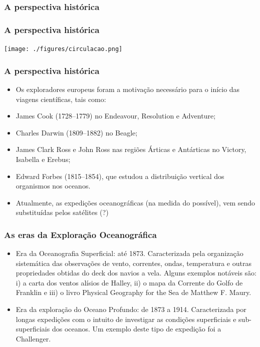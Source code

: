 \documentclass[14pt,xcolor=dvipsnames]{beamer}
\begin{document}
\begin{frame}
    \frametitle{A perspectiva histórica}
    \centerline{}
\end{frame}

\begin{frame}
    \frametitle{A perspectiva histórica}
    \centerline{\texttt{[image: ./figures/circulacao.png]}}
\end{frame}

\begin{frame}
    \frametitle{A perspectiva histórica}
\small{
    \begin{itemize}[<+-| alert@+>]
        \item Os exploradores europeus foram a motivação necessário para o início
            das viagens científicas, tais como:
        \item James Cook (1728--1779) no Endeavour, Resolution e Adventure;
        \item Charles Darwin (1809--1882) no Beagle;
        \item James Clark Ross e John Ross nas regiões Árticas e Antárticas no
            Victory, Isabella e Erebus;
        \item Edward Forbes (1815--1854), que estudou a distribuição vertical dos
            organismos nos oceanos.
        \item Atualmente, as expedições oceanográficas (na medida do possível),
              vem sendo substituídas pelos satélites (?)
    \end{itemize}
}
\end{frame}

\begin{frame}
    \frametitle{As eras da Exploração Oceanográfica}
\small{
    \begin{itemize}[<+-| alert@+>]
        \item Era da Oceanografia Superficial: até 1873. Caracterizada pela
              organização sistemática das observações de vento, correntes,
              ondas, temperatura e outras propriedades obtidas do deck dos
              navios a vela.  Alguns exemplos notáveis são: i) a carta dos
              ventos alísios de Halley, ii) o mapa da Corrente do Golfo de
              Franklin e iii) o livro Physical Geography for the Sea de Matthew
              F. Maury.
        \item Era da exploração do Oceano Profundo: de 1873 a 1914.
        Caracterizada por longas expedições com o intuito de investigar as
        condições superficiais e sub-superficiais dos oceanos. Um exemplo
        deste tipo de expedição foi a Challenger.
    \end{itemize}
}
\end{frame}
\end{document}
